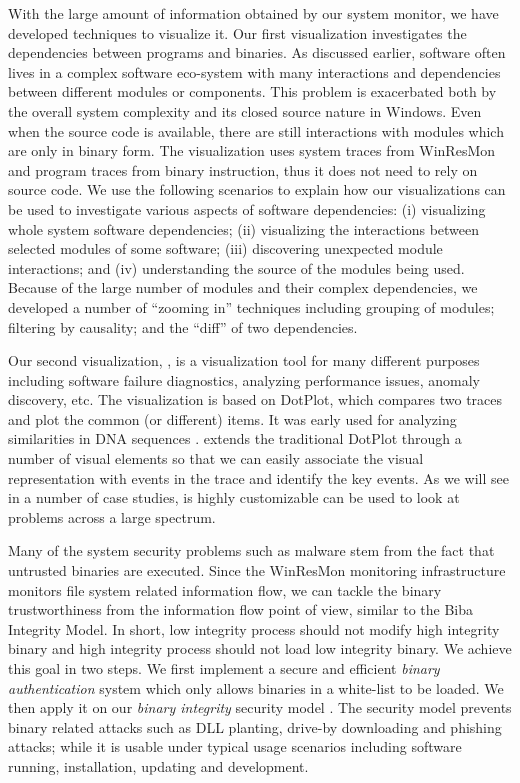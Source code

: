 With the large amount of information obtained by our system monitor,
we have developed techniques to visualize it.
Our first visualization \cite{wu2010comprehending} investigates the
dependencies between programs and binaries.
As discussed earlier,
software often lives in a complex software eco-system
with many interactions and dependencies between different
modules or components.
This problem is exacerbated both by the
overall system complexity and its closed source nature in Windows.
Even when the source code is available, there are still interactions with
modules which are only in binary form.
The visualization uses system traces from WinResMon and
program traces from binary instruction,
thus it does not need to rely on source code.
We use the following scenarios to explain how our visualizations can
be used to investigate various aspects of software dependencies:
(i) visualizing whole system software dependencies;
(ii) visualizing the interactions between selected modules of some software;
(iii) discovering unexpected module interactions;
and (iv) understanding the source of the modules being used.
Because of the large number of modules and their complex dependencies,
we developed a number of ``zooming in'' techniques including
grouping of modules;
filtering by causality; and
the ``diff'' of two dependencies.

Our second visualization,  \cite{wu2010visualizing},
is a visualization tool for many different purposes including
software failure diagnostics,
analyzing performance issues, anomaly discovery, etc.
The visualization is based on DotPlot, which compares two traces
and plot the common (or different) items.
It was early used for
analyzing similarities in DNA sequences \cite{maizel1981enhanced}.
 extends the traditional DotPlot through a number of visual elements
so that we can easily associate the visual representation with events in the
trace and identify the key events.
As we will see in a number of case studies,
 is highly customizable can be used to look at problems
across a large spectrum.

Many of the system security problems such as malware stem from the fact that
untrusted binaries are executed.
Since the WinResMon monitoring infrastructure monitors file system related information flow,
we can tackle the binary trustworthiness from the information
flow point of view, similar to the Biba Integrity Model.
In short, low integrity process should not modify high integrity binary and
high integrity process should not load low integrity binary.
We achieve this goal in two steps.
We first implement a secure and efficient {\em binary authentication} system
\cite{halim2008lightweight,wu2009esi}
which only allows binaries in a white-list to be loaded.
We then apply it on our {\em binary integrity} security model
\cite{wu2010pub,wu2011towards}.
The security model prevents binary related attacks such as DLL planting,
drive-by downloading and phishing attacks;
while it is usable under typical usage scenarios including
software running, installation, updating and development.

